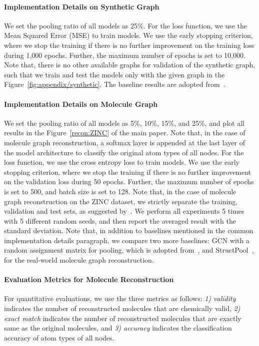 \documentclass{article} \usepackage{iclr2021_conference,times}
\begin{document}
\paragraph{Implementation Details on Synthetic Graph}
We set the pooling ratio of all models as 25\%. For the loss function, we use the Mean Squared Error (MSE) to train models. We use the early stopping criterion, where we stop the training if there is no further improvement on the training loss during 1,000 epochs. Further, the maximum number of epochs is set to 10,000. Note that, there is no other available graphs for validation of the synthetic graph, such that we train and test the models only with the given graph in the Figure~\ref{fig:appendix/synthetic}. The baseline results are adopted from~\citet{MincutPool}.


\paragraph{Implementation Details on Molecule Graph} 
We set the pooling ratio of all models as 5\%, 10\%, 15\%, and 25\%, and plot all results in the Figure~\ref{recon:ZINC} of the main paper. Note that, in the case of molecule graph reconstruction, a softmax layer is appended at the last layer of the model architecture to classify the original atom types of all nodes. For the loss function, we use the cross entropy loss to train models. We use the early stopping criterion, where we stop the training if there is no further improvement on the validation loss during 50 epochs. Further, the maximum number of epochs is set to 500, and batch size is set to 128. Note that, in the case of molecule graph reconstruction on the ZINC dataset, we strictly separate the training, validation and test sets, as suggested by~\citet{benchmarkingGNN}. We perform all experiments 5 times with 5 different random seeds, and then report the averaged result with the standard deviation. Note that, in addition to baselines mentioned in the common implementation details paragraph, we compare two more baselines: GCN with a random assignment matrix for pooling, which is adopted from~\citet{rethinking/pooling}, and StructPool~\citep{StructPool}, for the real-world molecule graph reconstruction.


\paragraph{Evaluation Metrics for Molecule Reconstruction}
For quantitative evaluations, we use the three metrics as follows: \textit{1) validity} indicates the number of reconstructed molecules that are chemically valid, \textit{2) exact match} indicates the number of reconstructed molecules that are exactly same as the original molecules, and \textit{3) accuracy} indicates the classification accuracy of atom types of all nodes.
\end{document}
